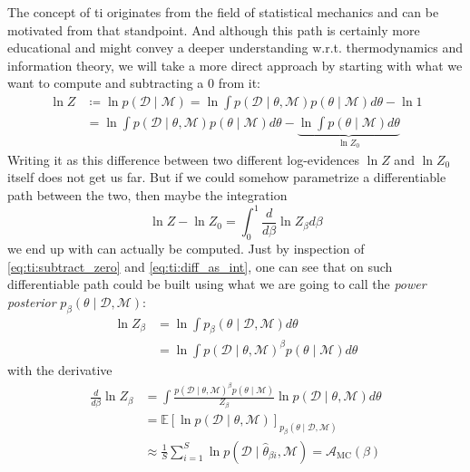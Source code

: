 \documentclass[\relativeRoot/main.tex]{subfiles}
\begin{document}
The concept of \gls{ti} originates from the field of statistical mechanics and can be motivated from that standpoint. And although this path is certainly more educational and might convey a deeper understanding w.r.t. thermodynamics and information theory, we will take a more direct approach by starting with what we want to compute and subtracting a 0 from it:
%
\begin{equation} \label{eq:ti:subtract_zero}
    \begin{aligned}
        \ln{Z} &\coloneqq \ln{p(\boldsymbol{\mathcal{D}} \mid \mathcal{M})} = \ln{\int{ p\left( \boldsymbol{\mathcal{D}} \mid \theta, \mathcal{M} \right) p(\theta \mid \mathcal{M}) d\theta}} - \ln{1} \\
        &= \ln{\int{ p\left( \boldsymbol{\mathcal{D}} \mid \theta, \mathcal{M} \right) p(\theta \mid \mathcal{M}) d\theta}} - \underbrace{ \ln{ \int{ p(\theta \mid \mathcal{M}) d\theta} } }_{\ln{Z_0}}
    \end{aligned}
\end{equation}
%
Writing it as this difference between two different log-evidences $\ln{Z}$ and $\ln{Z_0}$ itself does not get us far. But if we could somehow parametrize a differentiable path between the two, then maybe the integration
%
\begin{equation} \label{eq:ti:diff_as_int}
    \ln{Z} - \ln{Z_0} = \int_0^1{ \frac{d}{d\beta} \ln{Z_\beta} d\beta}
\end{equation}
%
we end up with can actually be computed. Just by inspection of \cref{eq:ti:subtract_zero} and \cref{eq:ti:diff_as_int}, one can see that on such differentiable path could be built using what we are going to call the \emph{power posterior} $p_\beta (\theta \mid \boldsymbol{\mathcal{D}}, \mathcal{M})$:
%
\begin{equation} \label{eq:ti:power_post}
    \begin{aligned}
        \ln{Z_\beta} &= \ln{ \int{ p_\beta (\theta \mid \boldsymbol{\mathcal{D}}, \mathcal{M}) d\theta} } \\
        &= \ln{\int{ p\left( \boldsymbol{\mathcal{D}} \mid \theta, \mathcal{M} \right)^\beta p(\theta \mid \mathcal{M}) d\theta}}
    \end{aligned}
\end{equation}
%
with the derivative
%
\begin{equation} \label{eq:ti:accuracy}
    \begin{aligned}
        \frac{d}{d\beta} \ln{Z_\beta} &= \int{ \frac{p\left( \boldsymbol{\mathcal{D}} \mid \theta, \mathcal{M} \right)^\beta p(\theta \mid \mathcal{M})}{Z_\beta} \ln{p(\boldsymbol{\mathcal{D}} \mid \theta, \mathcal{M} )} d\theta} \\
        &= \mathbb{E}\left[ \ln{ p(\boldsymbol{\mathcal{D}} \mid \theta, \mathcal{M}) } \right]_{p_\beta (\theta \mid \boldsymbol{\mathcal{D}}, \mathcal{M})} \\
        &\approx \frac{1}{S} \sum_{i=1}^S{ \ln{ p(\boldsymbol{\mathcal{D}} \mid \hat{\theta}_{\beta i}, \mathcal{M}) } } = \mathcal{A}_\text{MC}(\beta)
    \end{aligned}
\end{equation}
\end{document}
